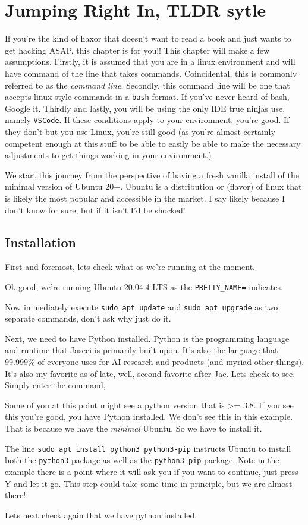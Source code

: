 \chapter{Jumping Right In, TLDR sytle}
If you're the kind of haxor that doesn't want to read a book and just wants to get hacking ASAP, this chapter is for you!! This chapter will make a few assumptions. Firstly, it is assumed that you are in a linux environment and will have command of the line that takes commands. Coincidental, this is commonly referred to as the \emph{command line}. Secondly, this command line will be one that accepts linux style commands in a \texttt{bash} format. If you've never heard of bash, Google it. Thirdly and lastly, you will be using the only IDE true ninjas use, namely \texttt{VSCode}. If these conditions apply to your environment, you're good. If they don't but you use Linux, you're still good (as you're almost certainly competent enough at this stuff to be able to easily be able to make the necessary adjustments to get things working in your environment.)

We start this journey from the perspective of having a fresh vanilla install of the minimal version of Ubuntu 20+. Ubuntu is a distribution or (flavor) of linux that is likely the most popular and accessible in the market. I say likely because I don't know for sure, but if it isn't I'd be shocked!

\section{Installation}
First and foremost, lets check what os we're running at the moment.
\par
{}
Ok good, we're running Ubuntu 20.04.4 LTS as the \texttt{PRETTY\_NAME=} indicates. 

Now immediately execute \texttt{sudo apt update} and \texttt{sudo apt upgrade} as two separate commands, don't ask why just do it. 

\par
Next, we need to have Python installed. Python is the programming language and runtime that Jaseci is primarily built upon. It's also the language that 99.999\% of everyone uses for AI research and products (and myriad other things). It's also my favorite as of late, well, second favorite after Jac. Lets check to see. Simply enter the command,
\par
{}
Some of you at this point might see a python version that is >= 3.8. If you see this you're good, you have Python installed. We don't see this in this example. That is because we have the \emph{minimal} Ubuntu. So we have to install it. 
\par
{}
\par
The line \texttt{sudo apt install python3 python3-pip} instructs Ubuntu to install both the \texttt{python3} package as well as the \texttt{python3-pip} package. Note in the example there is a point where it will ask you if you want to continue, just press Y and let it go. This step could take some time in principle, but we are almost there!

\par
Lets next check again that we have python installed. 
\par
{}